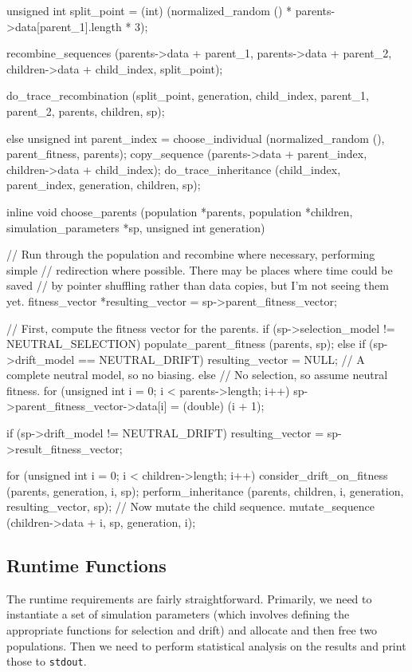 \documentclass{article}
\begin{document}
\begin{ccode}
{{    unsigned int split_point = (int)
      (normalized_random () * parents->data[parent_1].length * 3);

    recombine_sequences (parents->data + parent_1,
			 parents->data + parent_2,
			 children->data + child_index,
			 split_point);

    do_trace_recombination (split_point, generation, child_index, parent_1,
			    parent_2, parents, children, sp);
  } else {
    unsigned int parent_index = choose_individual (normalized_random (), parent_fitness, parents);
    copy_sequence (parents->data + parent_index, children->data + child_index);
    do_trace_inheritance (child_index, parent_index, generation, children, sp);
  }
}

inline void choose_parents (population *parents, population *children,
                      simulation_parameters *sp, unsigned int generation) {
  // Run through the population and recombine where necessary, performing simple
  // redirection where possible. There may be places where time could be saved
  // by pointer shuffling rather than data copies, but I'm not seeing them yet.
  fitness_vector *resulting_vector = sp->parent_fitness_vector;

  // First, compute the fitness vector for the parents.
  if (sp->selection_model != NEUTRAL_SELECTION)
    populate_parent_fitness (parents, sp);
  else if (sp->drift_model == NEUTRAL_DRIFT)
    resulting_vector = NULL; // A complete neutral model, so no biasing.
  else
    // No selection, so assume neutral fitness.
    for (unsigned int i = 0; i < parents->length; i++)
      sp->parent_fitness_vector->data[i] = (double) (i + 1);

  if (sp->drift_model != NEUTRAL_DRIFT)
    resulting_vector = sp->result_fitness_vector;

  for (unsigned int i = 0; i < children->length; i++) {
    consider_drift_on_fitness (parents, generation, i, sp);
    perform_inheritance (parents, children, i, generation, resulting_vector, sp);
    // Now mutate the child sequence.
    mutate_sequence (children->data + i, sp, generation, i);
  }
}
\end{ccode}

    \subsection{Runtime Functions}

      The runtime requirements are fairly straightforward. Primarily, we need to
      instantiate a set of simulation parameters (which involves defining the
	  appropriate functions for selection and drift) and allocate and then
      free two populations. Then we need to perform statistical analysis on the
      results and print those to \verb|stdout|.
\end{document}
